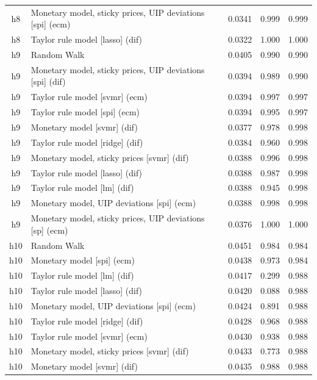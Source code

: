 \begin{ThreePartTable}
\begin{longtable}[t]{cp{5.5cm}ccc}
h8 & \raggedright Monetary model, sticky prices, UIP deviations [spi] (ecm) & 0.0341 & 0.999 & 0.999\\
h8 & \raggedright Taylor rule model [lasso] (dif) & 0.0322 & 1.000 & 1.000\\
\addlinespace
h9 & \raggedright Random Walk & 0.0405 & 0.990 & 0.990\\
h9 & \raggedright Monetary model, sticky prices, UIP deviations [spi] (dif) & 0.0394 & 0.989 & 0.990\\
h9 & \raggedright Taylor rule model [svmr] (ecm) & 0.0394 & 0.997 & 0.997\\
h9 & \raggedright Taylor rule model [spi] (ecm) & 0.0394 & 0.995 & 0.997\\
h9 & \raggedright Monetary model [svmr] (dif) & 0.0377 & 0.978 & 0.998\\
h9 & \raggedright Taylor rule model [ridge] (dif) & 0.0384 & 0.960 & 0.998\\
h9 & \raggedright Monetary model, sticky prices [svmr] (dif) & 0.0388 & 0.996 & 0.998\\
h9 & \raggedright Taylor rule model [lasso] (dif) & 0.0388 & 0.987 & 0.998\\
h9 & \raggedright Taylor rule model [lm] (dif) & 0.0388 & 0.945 & 0.998\\
h9 & \raggedright Monetary model, UIP deviations [spi] (ecm) & 0.0388 & 0.998 & 0.998\\
h9 & \raggedright Monetary model, sticky prices, UIP deviations [sp] (ecm) & 0.0376 & 1.000 & 1.000\\
\addlinespace
h10 & \raggedright Random Walk & 0.0451 & 0.984 & 0.984\\
h10 & \raggedright Monetary model [spi] (ecm) & 0.0438 & 0.973 & 0.984\\
h10 & \raggedright Taylor rule model [lm] (dif) & 0.0417 & 0.299 & 0.988\\
h10 & \raggedright Taylor rule model [lasso] (dif) & 0.0420 & 0.088 & 0.988\\
h10 & \raggedright Monetary model, UIP deviations [spi] (ecm) & 0.0424 & 0.891 & 0.988\\
h10 & \raggedright Taylor rule model [ridge] (dif) & 0.0428 & 0.968 & 0.988\\
h10 & \raggedright Taylor rule model [svmr] (ecm) & 0.0430 & 0.938 & 0.988\\
h10 & \raggedright Monetary model, sticky prices [svmr] (dif) & 0.0433 & 0.773 & 0.988\\
h10 & \raggedright Monetary model [svmr] (dif) & 0.0435 & 0.988 & 0.988\\

\end{longtable}
\end{ThreePartTable}
